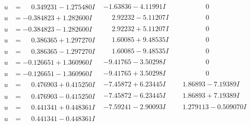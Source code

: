 \documentclass[1p]{elsarticle_modified}
\theoremstyle{definition}
\begin{document}
$$\begin{array}{c|c|c}
 \hline 
\begin{aligned}
u &= \phantom{-}0.349231 - 1.275480 I\end{aligned}
 & -1.63836 - 4.11991 I & \phantom{-0.000000 } 0 \\ \hline\begin{aligned}
u &= -0.384823 + 1.282600 I\end{aligned}
 & \phantom{-}2.92232 - 5.11207 I & \phantom{-0.000000 } 0 \\ \hline\begin{aligned}
u &= -0.384823 - 1.282600 I\end{aligned}
 & \phantom{-}2.92232 + 5.11207 I & \phantom{-0.000000 } 0 \\ \hline\begin{aligned}
u &= \phantom{-}0.386365 + 1.297270 I\end{aligned}
 & \phantom{-}1.60085 + 9.48535 I & \phantom{-0.000000 } 0 \\ \hline\begin{aligned}
u &= \phantom{-}0.386365 - 1.297270 I\end{aligned}
 & \phantom{-}1.60085 - 9.48535 I & \phantom{-0.000000 } 0 \\ \hline\begin{aligned}
u &= -0.126651 + 1.360960 I\end{aligned}
 & -9.41765 - 3.50298 I & \phantom{-0.000000 } 0 \\ \hline\begin{aligned}
u &= -0.126651 - 1.360960 I\end{aligned}
 & -9.41765 + 3.50298 I & \phantom{-0.000000 } 0 \\ \hline\begin{aligned}
u &= \phantom{-}0.476903 + 0.415250 I\end{aligned}
 & -7.45872 + 6.23445 I & \phantom{-}1.86893 - 7.19389 I \\ \hline\begin{aligned}
u &= \phantom{-}0.476903 - 0.415250 I\end{aligned}
 & -7.45872 - 6.23445 I & \phantom{-}1.86893 + 7.19389 I \\ \hline\begin{aligned}
u &= \phantom{-}0.441341 + 0.448361 I\end{aligned}
 & -7.59241 - 2.90093 I & \phantom{-}1.279113 - 0.509070 I \\ \hline\begin{aligned}
u &= \phantom{-}0.441341 - 0.448361 I\end{aligned}

\end{array}$$
\end{document}
